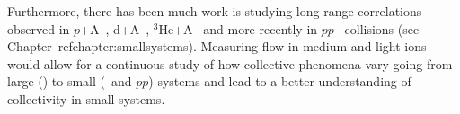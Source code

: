 Furthermore, there has been much work is studying long-range correlations
  observed in $p$+A~\cite{HION-2016-01,CMS:2012qk,Abelev:2012ola,HION-2012-13,HION-2013-04},
  d+A~\cite{Aidala:2017pup}, $^{3}\mathrm{He}$+A~\cite{Adare:2015ctn} 
  and more recently in $pp$~\cite{HION-2015-09,HION-2016-01} collisions 
  (see Chapter~ref{chapter:smallsystems}).
Measuring flow in medium and light ions would allow for a continuous study 
  of how collective phenomena vary going from large (\pbpb) to small 
  (\pA\ and $pp$) systems and lead to a better understanding of collectivity
  in small systems.



